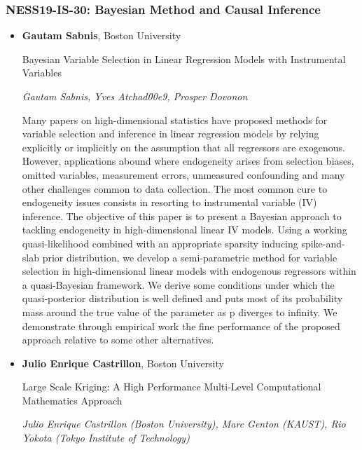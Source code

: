 \subsubsection*{NESS19-IS-30: Bayesian Method and Causal Inference}

\begin{itemize}
\item \textbf{Gautam Sabnis}, Boston University

Bayesian Variable Selection in Linear Regression Models with Instrumental Variables

\emph{\footnotesize Gautam Sabnis, Yves Atchad\u00e9, Prosper Dovonon}

Many papers on high-dimensional statistics have proposed methods for variable selection and inference in linear regression models by relying explicitly or implicitly on the assumption that all regressors are exogenous. However, applications abound where endogeneity arises from selection biases, omitted variables, measurement errors, unmeasured confounding and many other challenges common to data collection. The most common cure to endogeneity issues consists in resorting to instrumental variable (IV) inference. The objective of this paper is to present a Bayesian approach to tackling endogeneity in high-dimensional linear IV models. Using a working quasi-likelihood combined with an appropriate sparsity inducing spike-and-slab prior distribution, we develop a semi-parametric method for variable selection in high-dimensional linear models with endogenous regressors within a quasi-Bayesian framework. We derive some conditions under which the quasi-posterior distribution is well defined and puts most of its probability mass around the true value of the parameter as p diverges to infinity. We demonstrate through empirical work the fine performance of the proposed approach relative to some other alternatives.

\item \textbf{Julio Enrique Castrillon}, Boston University

Large Scale Kriging: A High Performance Multi-Level Computational Mathematics Approach

\emph{\footnotesize Julio Enrique Castrillon (Boston University),  Marc Genton (KAUST), Rio Yokota (Tokyo Institute of Technology)}


\end{itemize}
